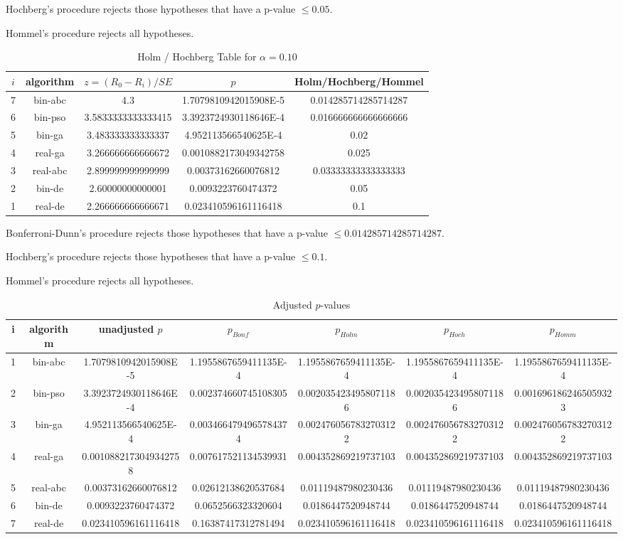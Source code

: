 \documentclass[a4paper,10pt]{article}
\begin{document}
\begin{landscape}
Hochberg's procedure rejects those hypotheses that have a p-value $\le0.05$.


Hommel's procedure rejects all hypotheses.


\begin{table}[!htp]
\centering\tiny
\caption{Holm / Hochberg Table for $\alpha=0.10$}
\begin{tabular}{ccccc}
$i$&algorithm&$z=(R_0 - R_i)/SE$&$p$&Holm/Hochberg/Hommel\\
\hline
7&bin-abc&4.3&1.7079810942015908E-5&0.014285714285714287\\
6&bin-pso&3.5833333333333415&3.3923724930118646E-4&0.016666666666666666\\
5&bin-ga&3.483333333333337&4.952113566540625E-4&0.02\\
4&real-ga&3.266666666666672&0.0010882173049342758&0.025\\
3&real-abc&2.899999999999999&0.00373162660076812&0.03333333333333333\\
2&bin-de&2.60000000000001&0.0093223760474372&0.05\\
1&real-de&2.266666666666671&0.023410596161116418&0.1\\
\hline
\end{tabular}
\end{table}
Bonferroni-Dunn's procedure rejects those hypotheses that have a p-value $\le0.014285714285714287$.


Hochberg's procedure rejects those hypotheses that have a p-value $\le0.1$.


Hommel's procedure rejects all hypotheses.


\begin{table}[!htp]
\centering\tiny
\caption{Adjusted $p$-values}
\begin{tabular}{ccccccc}
i&algorithm&unadjusted $p$&$p_{Bonf}$&$p_{Holm}$&$p_{Hoch}$&$p_{Homm}$\\
\hline
1&bin-abc&1.7079810942015908E-5&1.1955867659411135E-4&1.1955867659411135E-4&1.1955867659411135E-4&1.1955867659411135E-4\\
2&bin-pso&3.3923724930118646E-4&0.002374660745108305&0.0020354234958071186&0.0020354234958071186&0.0016961862465059323\\
3&bin-ga&4.952113566540625E-4&0.0034664794965784374&0.0024760567832703122&0.0024760567832703122&0.0024760567832703122\\
4&real-ga&0.0010882173049342758&0.007617521134539931&0.004352869219737103&0.004352869219737103&0.004352869219737103\\
5&real-abc&0.00373162660076812&0.02612138620537684&0.01119487980230436&0.01119487980230436&0.01119487980230436\\
6&bin-de&0.0093223760474372&0.0652566323320604&0.0186447520948744&0.0186447520948744&0.0186447520948744\\
7&real-de&0.023410596161116418&0.16387417312781494&0.023410596161116418&0.023410596161116418&0.023410596161116418\\
\hline
\end{tabular}
\end{table}


\end{landscape}
\end{document}
